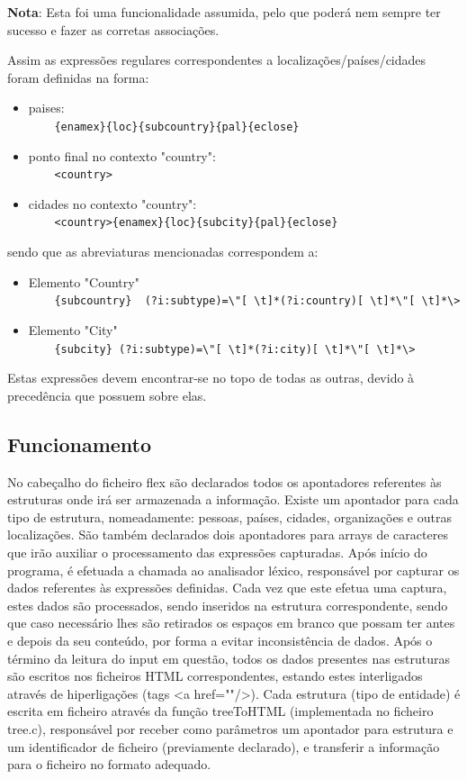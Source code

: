 \textbf{Nota}: Esta foi uma funcionalidade assumida, pelo que poderá nem sempre ter sucesso e fazer as corretas associações.

Assim as expressões regulares correspondentes a localizações/países/cidades foram definidas na forma:

\begin{itemize}
\item paises: \\
	\verb!    {enamex}{loc}{subcountry}{pal}{eclose}!
\item ponto final no contexto "country":\\
	\verb!    <country>!
\item cidades no contexto "country":\\
	\verb!    <country>{enamex}{loc}{subcity}{pal}{eclose}!
\end{itemize}

sendo que as abreviaturas mencionadas correspondem a:

\begin{itemize}
\item Elemento "Country"\\
	 \verb!    {subcountry}  (?i:subtype)=\"[ \t]*(?i:country)[ \t]*\"[ \t]*\>!
\item Elemento "City"\\
	 \verb!    {subcity} (?i:subtype)=\"[ \t]*(?i:city)[ \t]*\"[ \t]*\>!
     
\end{itemize}

Estas expressões devem encontrar-se no topo de todas as outras, devido à precedência que possuem sobre elas.

\subsection{Funcionamento}
\label{seq:enamex-func}

No cabeçalho do ficheiro flex são declarados todos os apontadores referentes às estruturas onde irá ser armazenada a informação. Existe um apontador para cada tipo de estrutura, nomeadamente: pessoas, países, cidades, organizações e outras localizações. São também declarados dois apontadores para arrays de caracteres que irão auxiliar o processamento das expressões capturadas. Após início do programa, é efetuada a chamada ao analisador léxico, responsável por capturar os dados referentes às expressões definidas. Cada vez que este efetua uma captura, estes dados são processados, sendo inseridos na estrutura correspondente, sendo que caso necessário lhes são retirados os espaços em branco que possam ter antes e depois da seu conteúdo, por forma a evitar inconsistência de dados. Após o término da leitura do input em questão, todos os dados presentes nas estruturas são escritos nos ficheiros HTML correspondentes, estando estes interligados através de hiperligações (tags <a href=""/>). Cada estrutura (tipo de entidade) é escrita em ficheiro através da função treeToHTML (implementada no ficheiro tree.c), responsável por receber como parâmetros um apontador para estrutura e um identificador de ficheiro (previamente declarado), e transferir a informação para o ficheiro no formato adequado.

